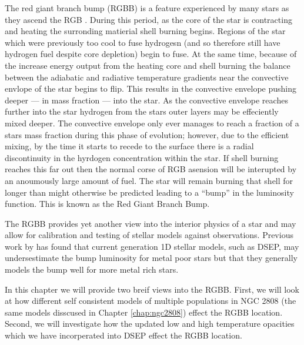 The red giant branch bump (RGBB) is a feature experienced by many stars as they
ascend the RGB \citep{Riello2003}. During this period, as the core of the star
is contracting and heating the surronding matierial shell burning begins.
Regions of the star which were previously too cool to fuse hydrogesn (and so
therefore still have hydrogen fuel despite core depletion) begin to fuse. At
the same time, because of the increase energy output from the heating core and
shell burning the balance between the adiabatic and radiative temperature
gradients near the convective envlope of the star begins to flip. This results
in the convective envelope pushing deeper --- in mass fraction --- into the
star. As the convective envelope reaches further into the star hydrogen from
the stars outer layers may be effeciently mixed deeper. The convective envelope
only ever manages to reach a fraction of a stars mass fraction during this
phase of evolution; however, due to the efficient mixing, by the time it starts
to recede to the surface there is a radial discontinuity in the hyrdogen
concentration within the star. If shell burning reaches this far out then the
normal corse of RGB asension will be interupted by an anoumously large amount
of fuel. The star will remain burning that shell for longer than might
otherwise be predicted leading to a ``bump'' in the luminosity function. This
is known as the Red Giant Branch Bump.

The RGBB provides yet another view into the interior physics of a star and may
allow for calibration and testing of stellar models against observations.
Previous work by \citet{Joyce2016} has found that current
generation 1D stellar models, such as DSEP, may undersestimate the bump
luminosity for metal poor stars but that they generally models the bump well
for more metal rich stars.

In this chapter we will provide two breif views into the RGBB. First, we will
look at how different self consistent models of multiple populations in NGC
2808 (the same models disscused in Chapter \ref{chap:ngc2808}) effect the
RGBB location. Second, we will investigate how the updated low and high
temperature opacities which we have incorperated into DSEP effect the RGBB
location.
